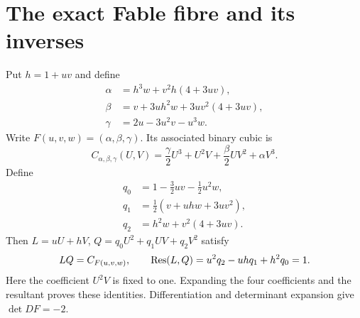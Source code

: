 \documentclass[11pt]{article}
\theoremstyle{remark}\newtheorem{remark}[theorem]{Remark}
\begin{document}
\section{The exact Fable fibre and its inverses}
Put $h=1+uv$ and define
\begin{align}
\alpha&=h^3w+v^2h(4+3uv),\\
\beta&=v+3uh^2w+3uv^2(4+3uv),\\
\gamma&=2u-3u^2v-u^3w.
\end{align}
Write $F(u,v,w)=(\alpha,\beta,\gamma)$. Its associated binary cubic is
\begin{equation}\label{eq:binary}
 C_{\alpha,\beta,\gamma}(U,V)
 =\frac\gamma2U^3+U^2V+\frac\beta2UV^2+\alpha V^3.
\end{equation}
Define
\begin{align*}
 q_0&=1-\tfrac32uv-\tfrac12u^2w,\\
 q_1&=\tfrac12(v+uhw+3uv^2),\\
 q_2&=h^2w+v^2(4+3uv).
\end{align*}
Then $L=uU+hV$, $Q=q_0U^2+q_1UV+q_2V^2$ satisfy
\begin{equation}\label{eq:factor}
 LQ=C_{F(u,v,w)},\qquad
 \operatorname{Res}(L,Q)=u^2q_2-uhq_1+h^2q_0=1.
\end{equation}
Here the coefficient $U^2V$ is fixed to one. Expanding the four coefficients and the resultant proves these identities. Differentiation and determinant expansion give $\det DF=-2$.
\end{document}
